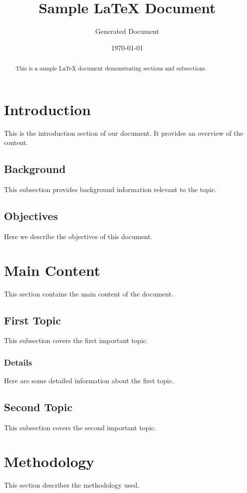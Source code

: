 \documentclass{article}
\title{Sample LaTeX Document}
\author{Generated Document}
\date{\today}
\begin{document}
\maketitle

\begin{abstract}
This is a sample LaTeX document demonstrating sections and subsections.
\end{abstract}

\section{Introduction}
This is the introduction section of our document. It provides an overview of the content.

\subsection{Background}
This subsection provides background information relevant to the topic.

\subsection{Objectives}
Here we describe the objectives of this document.

\section{Main Content}
This section contains the main content of the document.

\subsection{First Topic}
This subsection covers the first important topic.

\subsubsection{Details}
Here are some detailed information about the first topic.

\subsection{Second Topic}
This subsection covers the second important topic.

\section{Methodology}
This section describes the methodology used.
\end{document}
